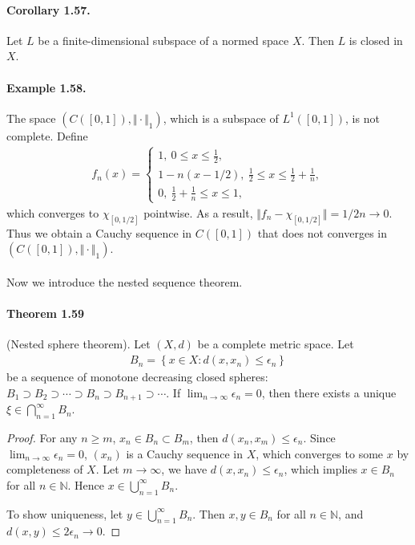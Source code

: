 \documentclass{article}
\begin{document}
\paragraph{Corollary 1.57.\label{cor:1.57}} Let $L$ be a finite-dimensional subspace of a normed space $X$. Then $L$ is closed in $X$.

\paragraph{Example 1.58.\label{example:1.58}} The space $(C([0,1]),\Vert\cdot\Vert_1)$, which is a subspace of $L^1([0,1])$, is not complete. Define
\begin{align*}
	f_n(x)=\begin{cases}
		1,\ 0\leq x\leq \frac{1}{2},\\
		1-n(x-1/2),\ \frac{1}{2}\leq x\leq \frac{1}{2} + \frac{1}{n},\\
		0,\ \frac{1}{2} + \frac{1}{n}\leq x\leq 1,
	\end{cases}
\end{align*}
which converges to $\chi_{[0,1/2]}$ pointwise. As a result, $\Vert f_n-\chi_{[0,1/2]}\Vert = 1/2n \to 0$. Thus we obtain a Cauchy sequence in $C([0,1])$ that does not converges in $(C([0,1]),\Vert\cdot\Vert_1)$.

\paragraph{} Now we introduce the nested sequence theorem.
\paragraph{Theorem 1.59\label{thm:1.59}} (Nested sphere theorem). Let $(X,d)$ be a complete metric space. Let
\begin{align*}
	B_n=\left\{x\in X:d(x,x_n)\leq\epsilon_n\right\}
\end{align*}
be a sequence of monotone decreasing closed spheres: $B_1\supset B_2\supset \cdots\supset B_n\supset B_{n+1}\supset\cdots$. If $\lim_{n\to\infty} \epsilon_n = 0$, then there exists a unique $\xi\in\bigcap_{n=1}^\infty B_n$.
\begin{proof}
For any $n\geq m$, $x_n\in B_n\subset B_m$, then $d(x_n,x_m) \leq \epsilon_n$. Since $\lim_{n\to\infty}\epsilon_n=0$, $(x_n)$ is a Cauchy sequence in $X$, which converges to some $x$ by completeness of $X$. Let $m\to\infty$, we have $d(x,x_n)\leq\epsilon_n$, which implies $x\in B_n$ for all $n\in \mathbb{N}$. Hence $x\in\bigcup_{n=1}^\infty B_n$.

To show uniqueness, let $y\in\bigcup_{n=1}^\infty B_n$. Then $x,y\in B_n$ for all $n\in\mathbb{N}$, and $d(x,y)\leq 2\epsilon_n\to 0$.
\end{proof}
\end{document}
